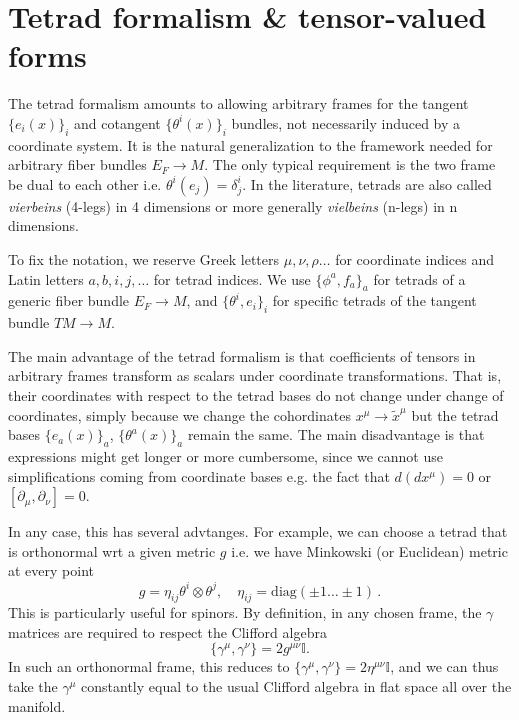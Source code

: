 \section{Tetrad formalism \& tensor-valued forms}

The tetrad formalism amounts to allowing arbitrary frames for the tangent $\{e_i(x)\}_i$ and cotangent  $\{\theta^i(x)\}_i$ bundles, not necessarily induced by a coordinate system.
It is the natural generalization to the framework needed for arbitrary fiber bundles $E_F\to M$.
The only typical requirement is the two frame be dual to each other i.e. $\theta^i (e_j) = \delta^i_j$.
In the literature, tetrads are also called \emph{vierbeins} (4-legs) in 4 dimensions or more generally \emph{vielbeins} (n-legs) in n dimensions.

To fix the notation, we reserve Greek letters $\mu,\nu,\rho\dots$ for coordinate indices and Latin letters $a,b,i,j,\dots$ for tetrad indices.
We use $\{\phi^a, f_a\}_a$ for tetrads of a generic fiber bundle $E_F\to M$, and $\{\theta^i,e_i\}_i$ for specific tetrads of the tangent bundle $TM\to M$.

\begin{mytheorem}
The main advantage of the tetrad formalism is that coefficients of tensors in arbitrary frames transform as scalars under coordinate transformations.
That is, their coordinates with respect to the tetrad bases do not change under change of coordinates, simply because we change the cohordinates $x^\mu\to \tilde{x}^\mu$ but the tetrad bases $\{e_a(x)\}_a$, $\{\theta^a(x)\}_a$ remain the same.
The main disadvantage is that expressions might get longer or more cumbersome, since we cannot use simplifications coming from coordinate bases e.g. the fact that $d (dx^\mu) = 0$ or $[\partial_\mu, \partial_\nu] = 0$.

In any case, this has several advtanges.
For example, we can choose a tetrad that is orthonormal wrt a given metric $g$ i.e. we have Minkowski (or Euclidean) metric at every point
\begin{equation}
    g = \eta_{ij} \theta^i \otimes \theta^j,\quad \eta_{ij}=\text{diag}(\pm1\dots \pm1)\,.
\end{equation}
This is particularly useful for spinors.
By definition, in any chosen frame, the $\gamma$ matrices are required to respect the Clifford algebra
\begin{equation}
    \{\gamma^\mu, \gamma^\nu\} = 2 g^{\mu\nu} \mathbb{I}.
\end{equation}
In such an orthonormal frame, this reduces to $\{\gamma^\mu, \gamma^\nu\} = 2 \eta^{\mu\nu} \mathbb{I}$, and we can thus take the $\gamma^\mu$ constantly equal to the usual Clifford algebra in flat space all over the manifold.
\end{mytheorem}




